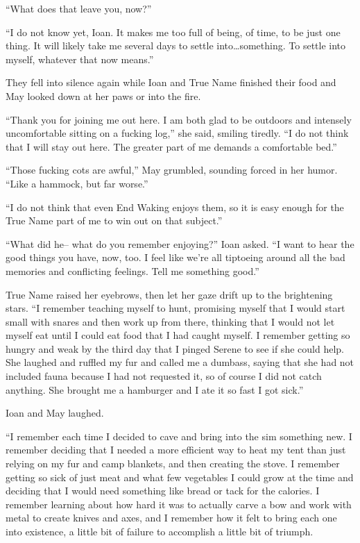 ``What does that leave you, now?''

``I do not know yet, Ioan. It makes me too full of being, of time, to be just one thing. It will likely take me several days to settle into\ldots something. To settle into myself, whatever that now means.''

They fell into silence again while Ioan and True Name finished their food and May looked down at her paws or into the fire.

``Thank you for joining me out here. I am both glad to be outdoors and intensely uncomfortable sitting on a fucking log,'' she said, smiling tiredly. ``I do not think that I will stay out here. The greater part of me demands a comfortable bed.''

``Those fucking cots are awful,'' May grumbled, sounding forced in her humor. ``Like a hammock, but far worse.''

``I do not think that even End Waking enjoys them, so it is easy enough for the True Name part of me to win out on that subject.''

``What did he-- what do you remember enjoying?'' Ioan asked. ``I want to hear the good things you have, now, too. I feel like we're all tiptoeing around all the bad memories and conflicting feelings. Tell me something good.''

True Name raised her eyebrows, then let her gaze drift up to the brightening stars. ``I remember teaching myself to hunt, promising myself that I would start small with snares and then work up from there, thinking that I would not let myself eat until I could eat food that I had caught myself. I remember getting so hungry and weak by the third day that I pinged Serene to see if she could help. She laughed and ruffled my fur and called me a dumbass, saying that she had not included fauna because I had not requested it, so of course I did not catch anything. She brought me a hamburger and I ate it so fast I got sick.''

Ioan and May laughed.

``I remember each time I decided to cave and bring into the sim something new. I remember deciding that I needed a more efficient way to heat my tent than just relying on my fur and camp blankets, and then creating the stove. I remember getting so sick of just meat and what few vegetables I could grow at the time and deciding that I would need something like bread or tack for the calories. I remember learning about how hard it was to actually carve a bow and work with metal to create knives and axes, and I remember how it felt to bring each one into existence, a little bit of failure to accomplish a little bit of triumph.


